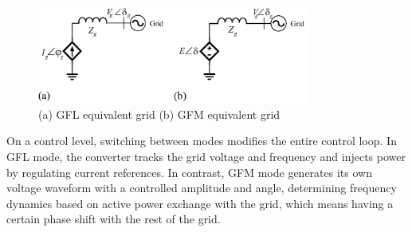 \documentclass{article}
\begin{document}
\begin{figure}[htbp]
    \centering
    \includegraphics[width=0.8\textwidth]{plots/gfm_gfl.png} %
    \caption{(a) GFL equivalent grid (b) GFM equivalent grid}
    \label{fig:low_voltage_bus}
\end{figure}

On a control level, switching between modes modifies the entire control loop. In GFL mode, the converter tracks the grid voltage and frequency and injects power by regulating current references. In contrast, GFM mode generates its own voltage waveform with a controlled amplitude and angle, determining frequency dynamics based on active power exchange with the grid, which means having a certain phase shift with the rest of the grid.  
\end{document}
